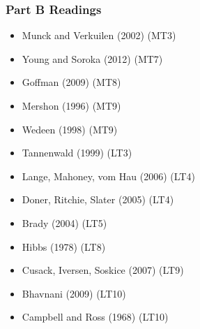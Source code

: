 \documentclass[17pt]{beamer} %
\begin{document}
\begin{frame}

\frametitle{Part B Readings}

\footnotesize

\begin{multicols}{2}
\begin{itemize}
\item Munck and Verkuilen (2002) (MT3)
\item Young and Soroka (2012) (MT7)
\item Goffman (2009) (MT8)
\item Mershon (1996) (MT9)
\item Wedeen (1998) (MT9)
\item Tannenwald (1999) (LT3)
\item Lange, Mahoney, vom Hau (2006) (LT4)
\item Doner, Ritchie, Slater (2005) (LT4)
\item Brady (2004) (LT5)
\item Hibbs (1978) (LT8)
\item Cusack, Iversen, Soskice (2007) (LT9)
\item Bhavnani (2009) (LT10)
\item Campbell and Ross (1968) (LT10)
\end{itemize}
\end{multicols}

\end{frame}



\appendix
\frame{}
\end{document}
